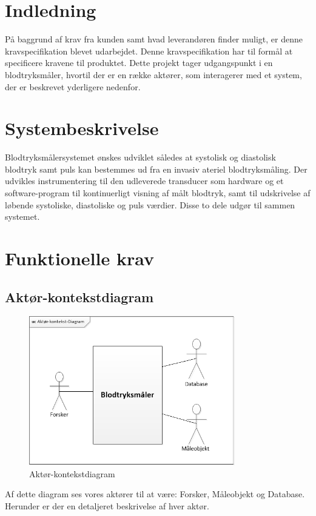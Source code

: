 \section{Indledning}
På baggrund af krav fra kunden samt hvad leverandøren finder muligt, er denne kravspecifikation blevet udarbejdet. Denne kravspecifikation har til formål at specificere kravene til produktet. Dette projekt tager udgangspunkt i en blodtryksmåler, hvortil der er en række aktører, som interagerer med et system, der er beskrevet yderligere nedenfor.

\section{Systembeskrivelse}
Blodtryksmålersystemet ønskes udviklet således at systolisk og diastolisk blodtryk samt puls kan bestemmes ud fra en invasiv ateriel blodtryksmåling. Der udvikles instrumentering til den udleverede transducer som hardware og et software-program til kontinuerligt visning af målt blodtryk, samt til udskrivelse af løbende systoliske, diastoliske og puls værdier. Disse to dele udgør til sammen systemet. 

\section{Funktionelle krav}
 

\subsection{Aktør-kontekstdiagram}


\begin{figure}[htb]
	\centering
	\includegraphics[width=0.8\textwidth]{Figurer/Aktor-kontekst-diagram}
	\caption{Aktør-kontekstdiagram}
	\label{fig:aktoerbeskrivelse}
\end{figure}
Af dette diagram ses vores aktører til at være: Forsker, Måleobjekt og Database. Herunder er der en detaljeret beskrivelse af hver aktør.


